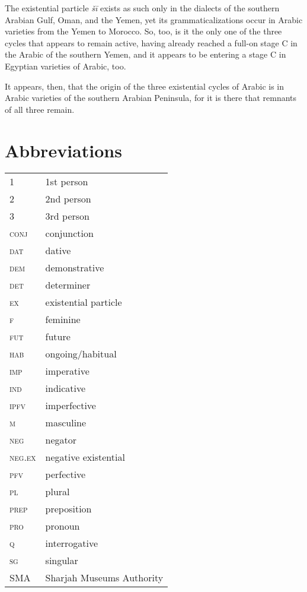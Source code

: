 \documentclass[output=paper]{langsci/langscibook}
\begin{document}
The existential particle \textit{šī} exists as such only in the dialects of the southern Arabian Gulf, Oman, and the Yemen, yet its grammaticalizations occur in Arabic varieties from the Yemen to Morocco. So, too, is it the only one of the three cycles that appears to remain active, having already reached a full-on stage C in the Arabic of the southern Yemen, and it appears to be entering a stage C in Egyptian varieties of Arabic, too.

It appears, then, that the origin of the three existential cycles of Arabic is in Arabic varieties of the southern Arabian Peninsula, for it is there that remnants of all three remain.

\section*{Abbreviations}
\begin{tabularx}{\textwidth}{lQ}
    1 & 1st person \\
    2 & 2nd person \\
    3 & 3rd person \\
    \textsc{conj} & conjunction \\
    \textsc{dat} & dative \\
    \textsc{dem}& demonstrative \\
    \textsc{det} & determiner \\
    \textsc{ex} & existential particle \\
    \textsc{f} & feminine \\
    \textsc{fut} & future \\
    \textsc{hab} & ongoing/habitual \\
    \textsc{imp} & imperative \\
    \textsc{ind} & indicative \\
    \textsc{ipfv} & imperfective \\
    \textsc{m} & masculine \\
    \textsc{neg} & negator \\
    \textsc{neg.ex} & negative existential \\
    \textsc{pfv} & perfective \\
    \textsc{pl} & plural \\
    \textsc{prep} & preposition \\
    \textsc{pro} & pronoun \\
    \textsc{q} & interrogative \\
    \textsc{sg} & singular \\
    SMA & Sharjah Museums Authority \\
\end{tabularx}
\end{document}
